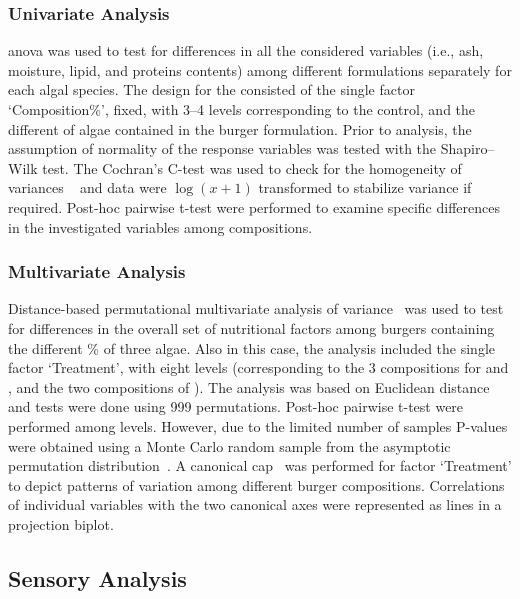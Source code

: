 \subsubsection{Univariate Analysis}
\Gls{anova} was used to test for differences in all the considered variables (i.e., ash, moisture, lipid, and proteins contents) among different formulations separately for each algal species. The design for the consisted of the single factor ‘Composition\%’, fixed, with \numrange[range-phrase={--}]{3}{4} levels corresponding to the control, and the different \zxriv{\%} of algae contained in the burger formulation. Prior to analysis, the assumption of normality of the response variables was tested with the Shapiro–Wilk test. The Cochran’s C-test was used to check for the homogeneity of variances ~\parencite{underwood_Experiments_1996} and data were $ \log(x + 1) $ transformed to stabilize variance if required. Post-hoc pairwise t-test were performed to examine specific differences in the investigated variables among compositions.

\subsubsection{Multivariate Analysis}
Distance-based permutational multivariate analysis of variance~\parencite{anderson_new_2001} was used to test for differences in the overall set of nutritional factors among burgers containing the different \% of three algae. Also in this case, the analysis included the single factor ‘Treatment’, with eight levels (corresponding to the 3 compositions for  and , and the two compositions of ). The analysis was based on Euclidean distance and tests were done using 999 permutations. Post-hoc pairwise t-test were performed among levels. However, due to the limited number of samples P-values were obtained using a Monte Carlo random sample from the asymptotic permutation distribution~\parencite{anderson_Generalized_2003}. A canonical \gls{cap}~\parencite{anderson_CANONICAL_2003} was performed for factor ‘Treatment’ to depict patterns of variation among different burger compositions. Correlations of individual variables with the two canonical axes were represented as lines in a projection biplot.

\subsection{Sensory Analysis}
